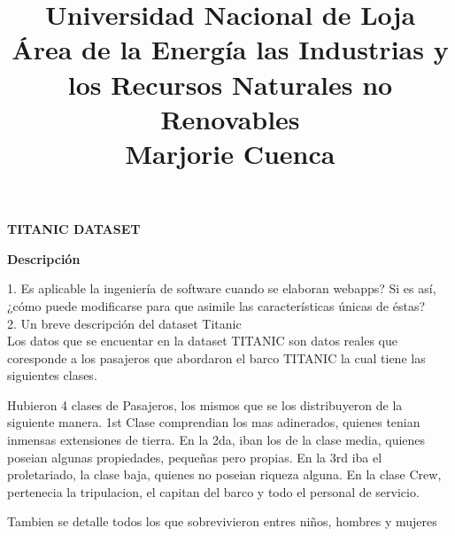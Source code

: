 \documentclass[11pt]{report}
\title{\Huge Universidad Nacional de Loja \\ 
Área de la Energía las Industrias y los Recursos Naturales no Renovables \\
Marjorie Cuenca \\}
\begin{document}

\maketitle

\begin{center}\textbf{TITANIC DATASET}\end{center}
\textbf{Descripción}

1. Es aplicable la ingeniería de software cuando se elaboran webapps? Si es así, ¿cómo puede modificarse para que asimile las características únicas de éstas?\\ 



2. Un breve descripción del dataset Titanic \\ 

Los datos que se encuentar en la dataset TITANIC son datos reales que coresponde a los pasajeros que abordaron el barco TITANIC la cual tiene las siguientes clases.

Hubieron 4 clases de Pasajeros, los mismos que se los distribuyeron de la siguiente manera. 1st Clase comprendian los mas adinerados, quienes tenian inmensas extensiones de tierra. En la 2da, iban los de la clase media, quienes poseian algunas propiedades, pequeñas pero propias. En la 3rd iba el proletariado, la clase baja, quienes no poseian riqueza alguna. En la clase Crew,  pertenecia la tripulacion, el capitan del barco y todo el personal de servicio. 

Tambien se detalle todos los que sobrevivieron entres niños, hombres y mujeres 
\end{document}
